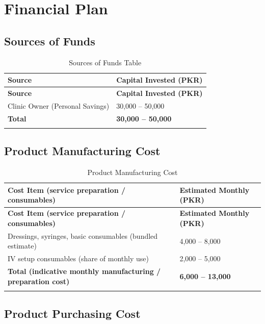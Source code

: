 \documentclass[12pt, a4paper]{article}
\begin{document}
\section{Financial Plan}\label{sec:financial}

\subsection{Sources of Funds}

\begin{longtable}{@{} L{8cm} R{6.4cm} @{}}
\toprule
\textbf{Source} & \textbf{Capital Invested (PKR)} \\
\midrule
\endfirsthead
\toprule
\textbf{Source} & \textbf{Capital Invested (PKR)} \\
\midrule
\endhead
Clinic Owner (Personal Savings) & 30,000 – 50,000 \\
\midrule
\textbf{Total} & \textbf{30,000 – 50,000} \\
\bottomrule
\caption{Sources of Funds Table}
\end{longtable}

\subsection{Product Manufacturing Cost}

\begin{longtable}{@{} L{9cm} R{5.4cm} @{}}
\toprule
\textbf{Cost Item (service preparation / consumables)} & \textbf{Estimated Monthly (PKR)} \\
\midrule
\endfirsthead
\toprule
\textbf{Cost Item (service preparation / consumables)} & \textbf{Estimated Monthly (PKR)} \\
\midrule
\endhead
Dressings, syringes, basic consumables (bundled estimate) & 4,000 -- 8,000 \\[4pt]
IV setup consumables (share of monthly use) & 2,000 -- 5,000 \\
\midrule
\textbf{Total (indicative monthly manufacturing / preparation cost)} & \textbf{6,000 -- 13,000} \\
\bottomrule
\caption{Product Manufacturing Cost}
\end{longtable}

\subsection{Product Purchasing Cost}
\end{document}
